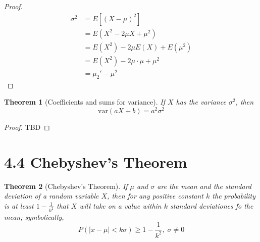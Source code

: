 \documentclass[
10pt,reqno
]{amsart}
\newtheorem{theorem}{Theorem}[section]
\theoremstyle{definition}
\begin{document}
\begin{proof}
\begin{align*}
\sigma^2 &= E[(X-\mu)^2]\\
&=E(X^2-2 \mu X+\mu^2)\\
&=E(X^2)-2 \mu E(X)+E(\mu^2)\\
&=E(X^2)-2 \mu \cdot \mu+\mu^2\\
&= \mu_2'-\mu^2
\end{align*}
\end{proof}

\begin{theorem}[Coefficients and sums for variance]
If \(X\) has the variance \(\sigma^2\), then
\[
\text{var}(aX+b)= a^2 \sigma^2
\]
\end{theorem}

\begin{proof}
TBD
\end{proof}

\section*{4.4 Chebyshev's Theorem}

\begin{theorem}[Chebyshev's Theorem]
If \(\mu\) and \(\sigma\) are the mean and the standard deviation of a random variable \(X\), then for any positive constant \(k\) the probability is \emph{at least} \(1 - \frac{1}{k^2}\) that \(X\) will take on a value within \(k\) standard deviationes fo the mean; symbolically,
\[
P(|x-\mu|< k \sigma) \ge 1- \frac{1}{k^2}, \; \sigma \ne 0
\]
\end{theorem}
\end{document}
